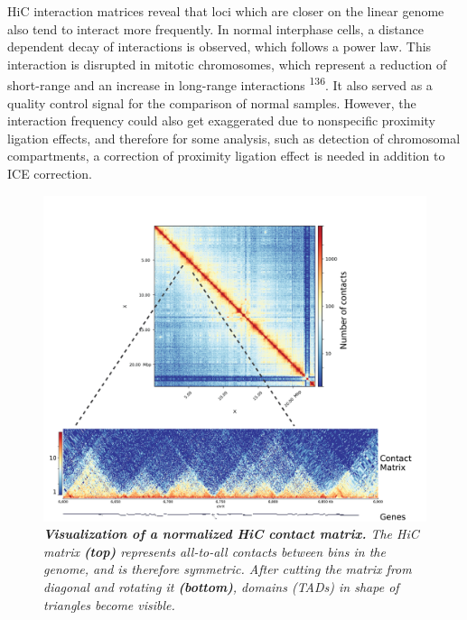 \documentclass[11pt,twoside]{MPIthesis}
\theoremstyle{definition}
\theoremstyle{definition}
\theoremstyle{definition}
\theoremstyle{remark}
\begin{document}
HiC interaction matrices reveal that loci which are closer on the linear
genome also tend to interact more frequently. In normal interphase
cells, a distance dependent decay of interactions is observed, which
follows a power law. This interaction is disrupted in mitotic
chromosomes, which represent a reduction of short-range and an increase
in long-range interactions \textsuperscript{136}. It also served as a
quality control signal for the comparison of normal samples. However,
the interaction frequency could also get exaggerated due to nonspecific
proximity ligation effects, and therefore for some analysis, such as
detection of chromosomal compartments, a correction of proximity
ligation effect is needed in addition to ICE correction.
\begin{figure}

{\centering \includegraphics[width=0.8\linewidth]{figures/intro_fig4} 

}

\caption[Visualization of a normalized HiC contact matrix]{\emph{\textbf{Visualization of a normalized HiC contact
matrix.} The HiC matrix \textbf{(top)} represents all-to-all contacts
between bins in the genome, and is therefore symmetric. After cutting
the matrix from diagonal and rotating it \textbf{(bottom)}, domains
(TADs) in shape of triangles become visible.}}\label{fig:unnamed-chunk-4}
\end{figure}
\end{document}
